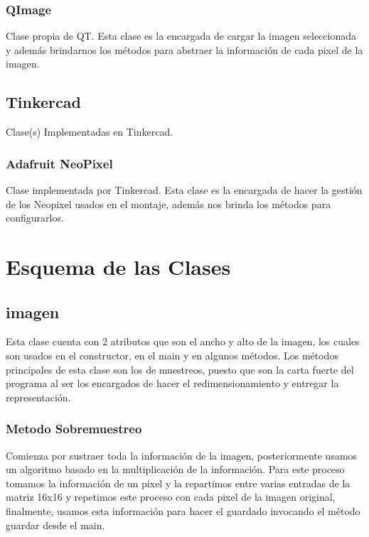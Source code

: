 \documentclass{article}
\begin{document}
    \begin{flushleft}
    \subsubsection{QImage}
    Clase propia de QT. Esta clase es la encargada de cargar la imagen seleccionada y además brindarnos los métodos para abstraer la información de cada pixel de la imagen.
    \end{flushleft}
    
    \begin{flushleft}
    \subsection{Tinkercad}
    Clase(s) Implementadas en Tinkercad.
    \end{flushleft}
    
     \begin{flushleft}
    \subsubsection{Adafruit NeoPixel}
    Clase implementada por Tinkercad. Esta clase es la encargada de hacer la gestión de los Neopixel usados en el montaje, además nos brinda los métodos para configurarlos.
    \end{flushleft}
    
\section{Esquema de las Clases}
\label{esquema}
    \begin{flushleft}
    \subsection{imagen}
    Esta clase cuenta con 2 atributos que son el ancho y alto de la imagen, los cuales son usados en el constructor, en el main y en algunos métodos. Los métodos principales de esta clase son los de muestreos, puesto que son la carta fuerte del programa al ser los encargados de hacer el redimensionamiento y entregar la representación.
    \end{flushleft}
    
    \begin{flushleft}
    \subsubsection{Metodo Sobremuestreo}
    Comienza por sustraer toda la información de la imagen, posteriormente usamos un algoritmo basado en la multiplicación de la información. Para este proceso tomamos la información de un pixel y la repartimos entre varias entradas de la matriz 16x16 y repetimos este proceso con cada pixel de la imagen original, finalmente, usamos esta información para hacer el guardado invocando el método guardar desde el main.
    \end{flushleft}
    
\end{document}
